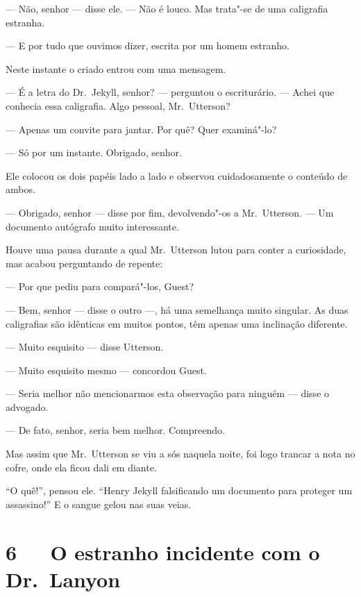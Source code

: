 --- Não, senhor --- disse ele. --- Não é louco.  Mas trata"-se de uma
caligrafia estranha.

--- E por tudo que ouvimos dizer, escrita por um homem estranho.

Neste instante o criado entrou com uma mensagem.

--- É a letra do Dr.~Jekyll, senhor? --- perguntou o escriturário. --- Achei
que conhecia essa caligrafia.  Algo pessoal, Mr.~Utterson?

--- Apenas um convite para jantar.  Por quê?  Quer examiná"-lo?

--- Só por um instante.  Obrigado, senhor.

Ele colocou os dois papéis lado a lado e observou cuidadosamente o
conteúdo de ambos.

--- Obrigado, senhor --- disse por fim, devolvendo"-os a Mr.~Utterson. --- Um
documento autógrafo muito interessante.

Houve uma pausa durante a qual Mr.~Utterson lutou para conter a
curiosidade, mas acabou perguntando de repente:

--- Por que pediu para compará"-los, Guest?

--- Bem, senhor --- disse o outro ---, há uma semelhança muito singular.  As
duas caligrafias são idênticas em muitos pontos, têm apenas uma
inclinação diferente.

--- Muito esquisito --- disse Utterson.

--- Muito esquisito mesmo --- concordou Guest.

--- Seria melhor não mencionarmos esta observação para ninguém --- disse o
advogado.

--- De fato, senhor, seria bem melhor.  Compreendo.

Mas assim que Mr.~Utterson se viu a sós naquela noite, foi logo trancar
a nota no cofre, onde ela ficou dali em diante.

“O quê!”, pensou ele.  “Henry Jekyll falsificando um documento para
proteger um assassino!”  E o sangue gelou nas suas veias. 


\chapter[6\ \ \ O estranho incidente com o Dr.~Lanyon]{6\ \ \ O estranho incidente com o Dr.~Lanyon}

